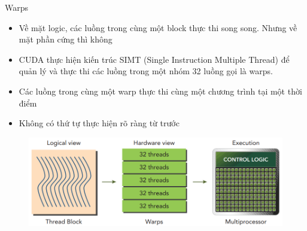 \documentclass[10pt]{beamer}
\theoremstyle{remark}
\numberwithin{algocf}{section}
\numberwithin{equation}{section}
\numberwithin{dl}{section}
\numberwithin{figure}{section}
\begin{document}
\begin{frame}{Warps}
    \begin{itemize}
        \item Về mặt logic, các luồng trong cùng một block thực thi song song. Nhưng về mặt phần cứng thì không
        \item CUDA thực hiện kiến trúc SIMT (Single Instruction Multiple Thread) để quản lý và thực thi các luồng trong một nhóm 32 luồng gọi là warps.
        \item Các luồng trong cùng một warp thực thi cùng một chương trình tại một thời điểm
        \item Không có thứ tự thực hiện rõ ràng từ trước
    \end{itemize}

    \begin{figure}[H]
        \centering
        \includegraphics[width=0.7\linewidth]{figures/CUDA/Logical_view_vs_Hardware_view.png}
    \end{figure}
\end{frame}
\end{document}

